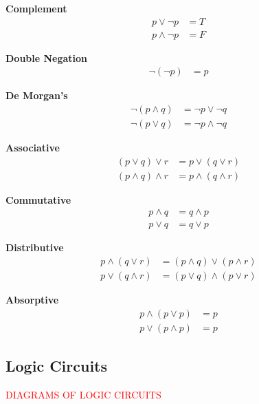 \begin{law}\label{mod1:law:Complement}
	\textbf{Complement}
	\begin{align}
	p \lor \lnot p &= T\\
	p \land \lnot p &= F
	\end{align}
\end{law}

\begin{law}\label{mod1:law:DoubleNegation}
	\textbf{Double Negation}
	\begin{align}
	\lnot(\lnot p) &= p
	\end{align}
\end{law}

\begin{law}\label{mod1:law:DeMorgan}
	\textbf{De Morgan's}
	\begin{align}
	\lnot (p \land q) &= \lnot p \lor \lnot q \\
	\lnot (p \lor q) &= \lnot p \land \lnot q 
	\end{align}
\end{law}

\begin{law}\label{mod1:law:Associative}
	\textbf{Associative}
	\begin{align}
	(p \lor q) \lor r &= p \lor (q \lor r) \\
	(p \land q) \land r &= p \land (q \land r) 
	\end{align}
\end{law}

 \begin{law}\label{mod1:law:Commutative}
	\textbf{Commutative}
	\begin{align}
	p \land q &= q \land p \\
	p \lor q &= q \lor p
	\end{align}
\end{law}

\begin{law}\label{mod1:law:Distributive}
	\textbf{Distributive}
	\begin{align}
	p \land (q \lor r) &= (p \land q) \lor (p \land r) \\
	p \lor (q \land r) &= (p \lor q) \land (p \lor r) 
	\end{align}
\end{law}

\begin{law}\label{mod1:law:Absorptive}
	\textbf{Absorptive}
	\begin{align}
	p \land (p \lor p) &= p\\
	p \lor (p \land p) &= p
	\end{align}
\end{law}


\subsection{Logic Circuits}\label{mod1:section:LogicCircuits}

\textcolor{red}{DIAGRAMS OF LOGIC CIRCUITS}








		
		
		
		
		
		
		
		
		
		
		
		